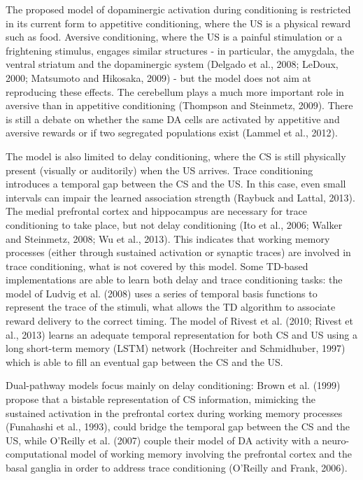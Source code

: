 \documentclass[
  11pt,
  a4paper,
]{scrbook}
\begin{document}
The proposed model of dopaminergic activation during conditioning is
restricted in its current form to appetitive conditioning, where the US
is a physical reward such as food. Aversive conditioning, where the US
is a painful stimulation or a frightening stimulus, engages similar
structures - in particular, the amygdala, the ventral striatum and the
dopaminergic system (Delgado et al., 2008; LeDoux, 2000; Matsumoto and
Hikosaka, 2009) - but the model does not aim at reproducing these
effects. The cerebellum plays a much more important role in aversive
than in appetitive conditioning (Thompson and Steinmetz, 2009). There is
still a debate on whether the same DA cells are activated by appetitive
and aversive rewards or if two segregated populations exist (Lammel et
al., 2012).

The model is also limited to delay conditioning, where the CS is still
physically present (visually or auditorily) when the US arrives. Trace
conditioning introduces a temporal gap between the CS and the US. In
this case, even small intervals can impair the learned association
strength (Raybuck and Lattal, 2013). The medial prefrontal cortex and
hippocampus are necessary for trace conditioning to take place, but not
delay conditioning (Ito et al., 2006; Walker and Steinmetz, 2008; Wu et
al., 2013). This indicates that working memory processes (either through
sustained activation or synaptic traces) are involved in trace
conditioning, what is not covered by this model. Some TD-based
implementations are able to learn both delay and trace conditioning
tasks: the model of Ludvig et al. (2008) uses a series of temporal basis
functions to represent the trace of the stimuli, what allows the TD
algorithm to associate reward delivery to the correct timing. The model
of Rivest et al. (2010; Rivest et al., 2013) learns an adequate temporal
representation for both CS and US using a long short-term memory (LSTM)
network (Hochreiter and Schmidhuber, 1997) which is able to fill an
eventual gap between the CS and the US.

Dual-pathway models focus mainly on delay conditioning: Brown et al.
(1999) propose that a bistable representation of CS information,
mimicking the sustained activation in the prefrontal cortex during
working memory processes (Funahashi et al., 1993), could bridge the
temporal gap between the CS and the US, while O'Reilly et al. (2007)
couple their model of DA activity with a neuro-computational model of
working memory involving the prefrontal cortex and the basal ganglia in
order to address trace conditioning (O'Reilly and Frank, 2006).
\end{document}

